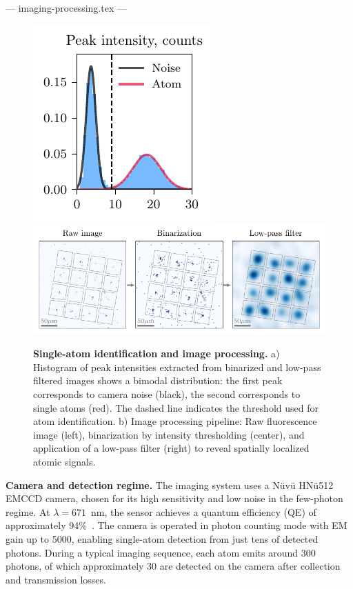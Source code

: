 --- imaging-processing.tex ---


\begin{figure}
    \centering
    \includegraphics{fig-py/imaging-hist.pdf}
    \hfill
    \includegraphics{fig-py/imaging-base.pdf}
    \caption{
        \textbf{Single-atom identification and image processing.}
        a) Histogram of peak intensities extracted from binarized and low-pass filtered images shows a bimodal distribution: the first peak corresponds to camera noise (black), the second corresponds to single atoms (red). The dashed line indicates the threshold used for atom identification.
        b) Image processing pipeline: Raw fluorescence image (left), binarization by intensity thresholding (center), and application of a low-pass filter (right) to reveal spatially localized atomic signals. 
    }
    \label{fig:imaging}
\end{figure}

\textbf{Camera and detection regime.}  
The imaging system uses a Nüvü HNü512 EMCCD camera, chosen for its high sensitivity and low noise in the few-photon regime. At $\lambda = 671$~nm, the sensor achieves a quantum efficiency (QE) of approximately 94\%~\cite{kruip_design_2024}. The camera is operated in photon counting mode with EM gain up to 5000, enabling single-atom detection from just tens of detected photons. During a typical imaging sequence, each atom emits around 300 photons, of which approximately 30 are detected on the camera after collection and transmission losses.

